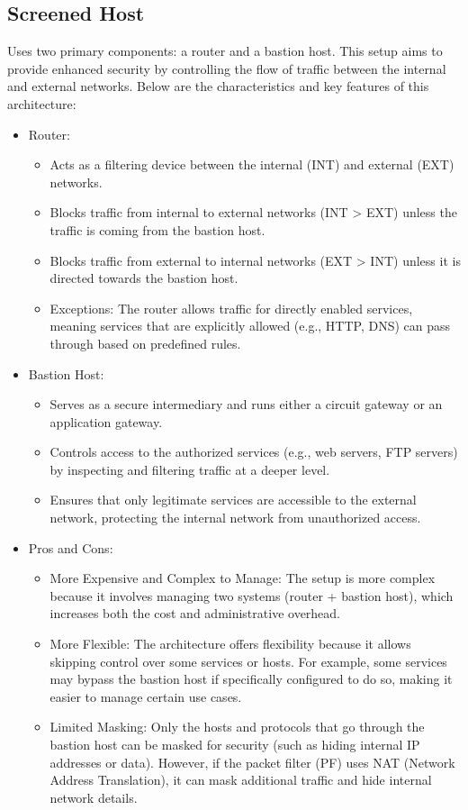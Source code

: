 \subsection{Screened Host}
Uses two primary components: a router and a bastion host. This setup aims to provide enhanced security by controlling the flow of traffic between the internal and external networks. Below are the characteristics and key features of this architecture:

\begin{itemize}
    \item Router:
    \begin{itemize}
        \item Acts as a filtering device between the internal (INT) and external (EXT) networks.
        \item Blocks traffic from internal to external networks (INT > EXT) unless the traffic is coming from the bastion host.
        \item Blocks traffic from external to internal networks (EXT > INT) unless it is directed towards the bastion host.
        \item Exceptions: The router allows traffic for directly enabled services, meaning services that are explicitly allowed (e.g., HTTP, DNS) can pass through based on predefined rules.
    \end{itemize}
    \item Bastion Host:
    \begin{itemize}
        \item Serves as a secure intermediary and runs either a circuit gateway or an application gateway.
        \item Controls access to the authorized services (e.g., web servers, FTP servers) by inspecting and filtering traffic at a deeper level.
        \item Ensures that only legitimate services are accessible to the external network, protecting the internal network from unauthorized access.
    \end{itemize}
    \item Pros and Cons:
    \begin{itemize}
        \item More Expensive and Complex to Manage: The setup is more complex because it involves managing two systems (router + bastion host), which increases both the cost and administrative overhead.
        \item More Flexible: The architecture offers flexibility because it allows skipping control over some services or hosts. For example, some services may bypass the bastion host if specifically configured to do so, making it easier to manage certain use cases.
        \item Limited Masking: Only the hosts and protocols that go through the bastion host can be masked for security (such as hiding internal IP addresses or data). However, if the packet filter (PF) uses NAT (Network Address Translation), it can mask additional traffic and hide internal network details.
    \end{itemize}
\end{itemize}

